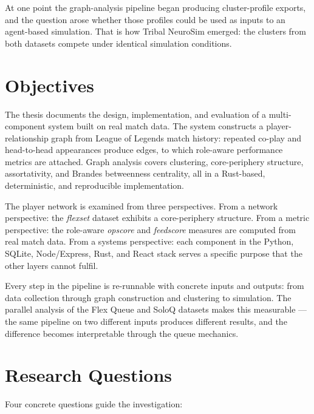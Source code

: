 At one point the graph-analysis pipeline began producing cluster-profile exports, and the question arose whether those profiles could be used as inputs to an agent-based simulation. That is how Tribal NeuroSim emerged: the clusters from both datasets compete under identical simulation conditions.

\section{Objectives}

The thesis documents the design, implementation, and evaluation of a multi-component system built on real match data. The system constructs a player-relationship graph from League of Legends match history: repeated co-play and head-to-head appearances produce edges, to which role-aware performance metrics are attached. Graph analysis covers clustering, core-periphery structure, assortativity, and Brandes betweenness centrality, all in a Rust-based, deterministic, and reproducible implementation.

The player network is examined from three perspectives. From a network perspective: the \textit{flexset} dataset exhibits a core-periphery structure. From a metric perspective: the role-aware \textit{opscore} and \textit{feedscore} measures are computed from real match data. From a systems perspective: each component in the Python, SQLite, Node/Express, Rust, and React stack serves a specific purpose that the other layers cannot fulfil.

Every step in the pipeline is re-runnable with concrete inputs and outputs: from data collection through graph construction and clustering to simulation. The parallel analysis of the Flex Queue and SoloQ datasets makes this measurable --- the same pipeline on two different inputs produces different results, and the difference becomes interpretable through the queue mechanics.

\section{Research Questions}

Four concrete questions guide the investigation:

